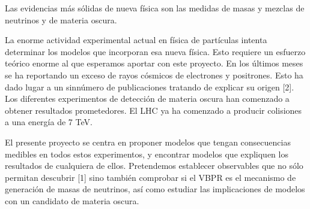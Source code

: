 Las evidencias más sólidas de nueva física son las medidas de masas y mezclas de neutrinos y de materia oscura.

La enorme actividad experimental actual en física de partículas intenta determinar los modelos que incorporan esa nueva física. Esto requiere un esfuerzo teórico enorme al que esperamos aportar con este proyecto. En los últimos meses se ha reportando un exceso de rayos cósmicos de electrones y positrones.  Esto ha dado lugar a un sinnúmero de publicaciones tratando de explicar su origen [2]. Los diferentes experimentos de detección de materia oscura han comenzado a obtener resultados prometedores. El LHC ya ha comenzado a producir colisiones a una energía de 7 TeV.

El presente proyecto se centra en proponer modelos que tengan consecuencias medibles en todos estos experimentos, y encontrar modelos que expliquen los resultados de cualquiera de ellos. Pretendemos establecer observables que no sólo permitan descubrir [1] sino también  comprobar si el VBPR es el mecanismo de generación de masas de neutrinos, así como estudiar las implicaciones de modelos con un candidato de materia oscura. 

